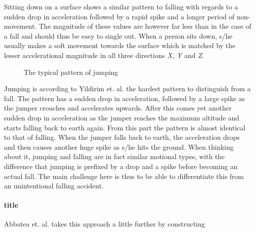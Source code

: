\documentclass[12pt, a4paper, onecolumn]{article}
\begin{document}
		\noindent Sitting down on a surface shows a similar pattern to falling with regards to a sudden drop in acceleration followed by  a rapid spike and a longer period of non-movement. The magnitude of these values are however far less than in the case of a fall and should thus be easy to single out. When a person sits down, s/he usually makes a soft movement towards the surface which is matched by the lesser accelerational  magnitude in all three directions \textit{X, Y} and \textit{Z}.
	
	
		\begin{figure}[h]
			\centering
			\caption{The typical pattern of jumping}%
			\label{fig:example}%
		\end{figure}
	
		\noindent Jumping is according to Yildirim et. al. the hardest pattern to distinguish from a fall. The pattern has a sudden drop in acceleration, followed by a large spike as the jumper crouches and accelerates upwards. After this comes yet another sudden drop in acceleration as the jumper reaches the maximum altitude and starts falling back to earth again. From this part the pattern is almost identical to that of falling. When the jumper falls back to earth, the acceleration drops and then causes another huge spike as s/he hits the ground. When thinking about it, jumping and falling are in fact similar motional types, with the difference that jumping is prefixed by a drop and a spike before becoming an actual fall. The main challenge here is thus to be able to differentiate this from an unintentional falling accident.
		
		
		\paragraph{title} Abbatea et. al. takes this approach a little further by constructing 
	
\newpage




\end{document}
